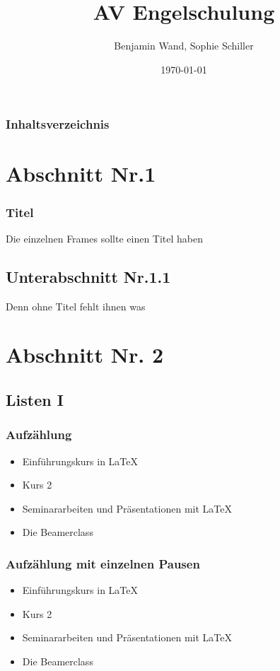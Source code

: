 \documentclass[hyperref={pdfpagelabels=false}]{beamer}
\title{AV Engelschulung}    %
\author{Benjamin Wand, Sophie Schiller}  %
\date{\today}
\begin{document}
\begin{frame}
\titlepage
\end{frame} 

\begin{frame}
\frametitle{Inhaltsverzeichnis}   %
\tableofcontents
\end{frame} 


\section{Abschnitt Nr.1} 
\begin{frame}
\frametitle{Titel} 
Die einzelnen Frames sollte einen Titel haben 
\end{frame}
\subsection{Unterabschnitt Nr.1.1  }
\begin{frame} 
Denn ohne Titel fehlt ihnen was
\end{frame}


\section{Abschnitt Nr. 2} 
\subsection{Listen I}
\begin{frame}
\frametitle{Aufz\"ahlung}
\begin{itemize}
\item Einf\"uhrungskurs in \LaTeX{}  
\item Kurs 2  
\item Seminararbeiten und Pr\"asentationen mit \LaTeX{} 
\item Die Beamerclass 
\end{itemize} 
\end{frame}

\begin{frame}
\frametitle{Aufz\"ahlung mit einzelnen Pausen}
\begin{itemize}
\item  Einf\"uhrungskurs in \LaTeX{} \pause 
\item  Kurs 2 \pause 
\item  Seminararbeiten und Pr\"asentationen mit \LaTeX{} \pause 
\item  Die Beamerclass
\end{itemize} 
\end{frame}
\end{document}

